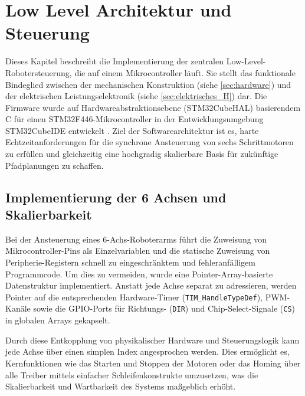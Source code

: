 \chapter{Low Level Architektur und Steuerung}

\label{sec:software}

Dieses Kapitel beschreibt die Implementierung der zentralen Low-Level-Robotersteuerung, die auf einem Mikrocontroller läuft. Sie stellt das funktionale Bindeglied zwischen der mechanischen Konstruktion (siehe \ref{sec:hardware}) und der elektrischen Leistungselektronik (siehe \ref{sec:elektrisches_H}) dar. Die Firmware wurde auf Hardwareabstraktionsebene (STM32CubeHAL) basierendem C für einen STM32F446-Mikrocontroller in der Entwicklungsumgebung STM32CubeIDE entwickelt \cite{a2021_this}. Ziel der Softwarearchitektur ist es, harte Echtzeitanforderungen für die synchrone Ansteuerung von sechs Schrittmotoren zu erfüllen und gleichzeitig eine hochgradig skalierbare Basis für zukünftige Pfadplanungen zu schaffen.

\section{Implementierung der 6 Achsen und Skalierbarkeit}
\label{subsec:hal}

Bei der Ansteuerung eines 6-Achs-Roboterarms führt die Zuweisung von Mikrocontroller-Pins als Einzelvariablen und die statische Zuweisung von Peripherie-Registern schnell zu eingeschränktem und fehleranfälligem Programmcode. Um dies zu vermeiden, wurde eine Pointer-Array-basierte Datenstruktur implementiert. Anstatt jede Achse separat zu adressieren, werden Pointer auf die entsprechenden Hardware-Timer (\texttt{TIM\_HandleTypeDef}), PWM-Kanäle sowie die GPIO-Ports für Richtungs- (\texttt{DIR}) und Chip-Select-Signale (\texttt{CS}) in globalen Arrays gekapselt.\cite{a2021_this}

Durch diese Entkopplung von physikalischer Hardware und Steuerungslogik kann jede Achse über einen simplen Index angesprochen werden. Dies ermöglicht es, Kernfunktionen wie das Starten und Stoppen der Motoren oder das Homing über alle Treiber mittels einfacher Schleifenkonstrukte umzusetzen, was die Skalierbarkeit und Wartbarkeit des Systems maßgeblich erhöht.

